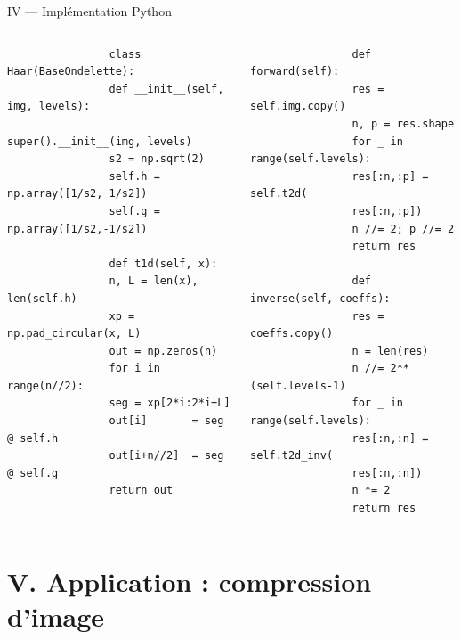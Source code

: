 \documentclass[10pt]{beamer}
\begin{document}
	\begin{frame}[fragile]{IV — Implémentation Python}
		
		\begin{columns}[T]
			
			\begin{lstlisting}
				class Haar(BaseOndelette):
				def __init__(self, img, levels):
				super().__init__(img, levels)
				s2 = np.sqrt(2)
				self.h = np.array([1/s2, 1/s2])
				self.g = np.array([1/s2,-1/s2])
				
				def t1d(self, x):
				n, L = len(x), len(self.h)
				xp = np.pad_circular(x, L)
				out = np.zeros(n)
				for i in range(n//2):
				seg = xp[2*i:2*i+L]
				out[i]       = seg @ self.h
				out[i+n//2]  = seg @ self.g
				return out
			\end{lstlisting}
			
			
			\begin{lstlisting}
				def forward(self):
				res = self.img.copy()
				n, p = res.shape
				for _ in range(self.levels):
				res[:n,:p] = self.t2d(
				res[:n,:p])
				n //= 2; p //= 2
				return res
				
				def inverse(self, coeffs):
				res = coeffs.copy()
				n = len(res)
				n //= 2**(self.levels-1)
				for _ in range(self.levels):
				res[:n,:n] = self.t2d_inv(
				res[:n,:n])
				n *= 2
				return res
			\end{lstlisting}
			
		\end{columns}
		
	\end{frame}
	
	\section{V. Application : compression d'image}
	
\end{document}
